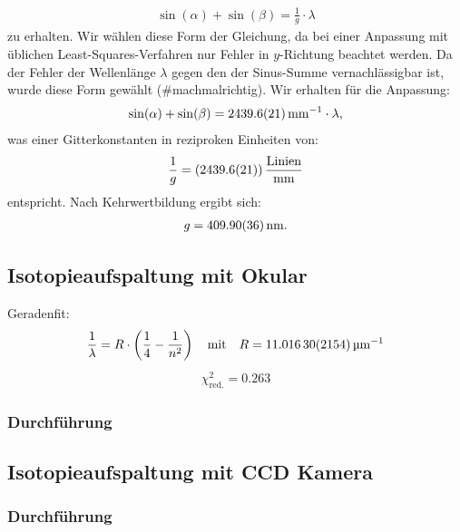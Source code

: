 \documentclass[11pt, a4paper]{article}
\numberwithin{equation}{section}
\begin{document}
\begin{align*}
	\sin(\alpha) + \sin(\beta) = \frac{1}{g} \cdot \lambda
\end{align*}
zu erhalten.
Wir wählen diese Form der Gleichung, da bei einer Anpassung mit üblichen Least-Squares-Verfahren nur Fehler in $y$-Richtung beachtet werden.
Da der Fehler der Wellenlänge $\lambda$ gegen den der Sinus-Summe vernachlässigbar ist, wurde diese Form gewählt (\#machmalrichtig).
Wir erhalten für die Anpassung:
\begin{align}
	\sin(\alpha) + \sin(\beta) = \SI{2439.6 +- 2.1}{\per\milli\metre} \cdot \lambda \text{,}
\end{align}
was einer Gitterkonstanten in reziproken Einheiten von:
\begin{align*}
	\frac{1}{g} = (\num{2439.6 +- 2.1}) \, \frac{\mathrm{Linien}}{\si{\milli\metre}}
\end{align*}
entspricht.
Nach Kehrwertbildung ergibt sich:
\begin{align*}
	g = \SI{409.90 +- 0.36}{\nano\metre} \text{.}
\end{align*}

\subsection{Isotopieaufspaltung mit Okular}

Geradenfit:
\begin{align*}
	\frac{1}{\lambda} = R \cdot \left( \frac{1}{4} - \frac{1}{n^2} \right) \quad \text{mit} \quad R = \SI{11.0163 +- 0.02154}{\per\micro\metre}
\end{align*}
\begin{align*}
	\chi_\mathrm{red.}^2 = \num{0.263}
\end{align*}


\subsubsection{Durchführung}
\label{sec:balmer_okular}

\subsection{Isotopieaufspaltung mit CCD Kamera}

\subsubsection{Durchführung}
\end{document}
